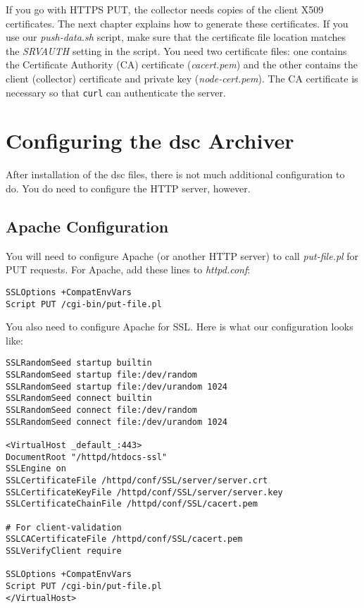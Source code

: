 \documentclass{report}
\def\dsc{{\sc dsc}}
\begin{document}
If you go with HTTPS PUT, the collector needs copies of the client
X509 certificates.  The next chapter explains how to generate these
certificates.  If you use our {\em push-data.sh\/} script, make
sure that the certificate file location matches the {\em SRVAUTH\/}
setting in the script.  You need two certificate files: one contains
the Certificate Authority (CA) certificate ({\em cacert.pem\/}) and the
other contains the client (collector) certificate and private key
({\em node-cert.pem\/}).  The CA certificate is
necessary so that {\tt curl\/} can authenticate the server.


\chapter{Configuring the {\dsc} Archiver}

After installation of the {\dsc} files, there is not much additional
configuration to do.  You do need to configure the HTTP server, however.

\section{Apache Configuration}

You will need to configure Apache (or another HTTP server) to call
{\em put-file.pl\/} for PUT requests.  For Apache, add these lines
to {\em httpd.conf\/}:

\begin{verbatim}
SSLOptions +CompatEnvVars
Script PUT /cgi-bin/put-file.pl
\end{verbatim}

\noindent
You also need to configure Apache for SSL.  Here is what our configuration looks like:

\begin{verbatim}
SSLRandomSeed startup builtin
SSLRandomSeed startup file:/dev/random
SSLRandomSeed startup file:/dev/urandom 1024
SSLRandomSeed connect builtin
SSLRandomSeed connect file:/dev/random
SSLRandomSeed connect file:/dev/urandom 1024

<VirtualHost _default_:443>
DocumentRoot "/httpd/htdocs-ssl"
SSLEngine on
SSLCertificateFile /httpd/conf/SSL/server/server.crt
SSLCertificateKeyFile /httpd/conf/SSL/server/server.key
SSLCertificateChainFile /httpd/conf/SSL/cacert.pem

# For client-validation
SSLCACertificateFile /httpd/conf/SSL/cacert.pem
SSLVerifyClient require

SSLOptions +CompatEnvVars
Script PUT /cgi-bin/put-file.pl
</VirtualHost>
\end{verbatim}
\end{document}
